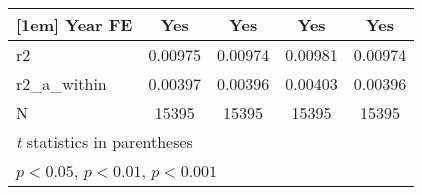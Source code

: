 {\begin{tabular}{l*{4}{c}}
[1em]
Year FE     &         Yes         &         Yes         &         Yes         &         Yes         \\
\hline
r2          &     0.00975         &     0.00974         &     0.00981         &     0.00974         \\
r2\_a\_within &     0.00397         &     0.00396         &     0.00403         &     0.00396         \\
N           &       15395         &       15395         &       15395         &       15395         \\
\hline\hline
\multicolumn{5}{l}{\footnotesize \textit{t} statistics in parentheses}\\
\multicolumn{5}{l}{\footnotesize \sym{*} \(p<0.05\), \sym{**} \(p<0.01\), \sym{***} \(p<0.001\)}\\
\end{tabular}
}
